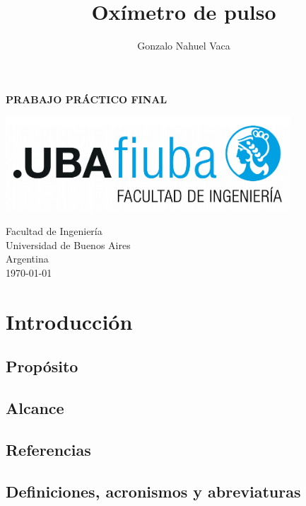 \documentclass[
    11pt,
    spanish,
	a4paper
]{article}
\title{Oxímetro de pulso}
\author{Gonzalo Nahuel Vaca}
\def\doctype{PRABAJO PRÁCTICO FINAL}
\begin{document}
\makeatletter
\begin{titlepage}
	\begin{center}
		\vspace*{1cm}
		
		\Huge
		\textbf{\doctype}
		
		\vspace{0.5cm}
		\LARGE
		\@title
		
		\vspace{1.5cm}
		
		\textbf{\@author}

		\vspace{3.5cm}

		\includegraphics[width=0.8\textwidth]{img/logoFIUBA.pdf}
		
		\vfill
		Facultad de Ingeniería\\
		Universidad de Buenos Aires\\
		Argentina\\
		\today
	\end{center}
\end{titlepage}
\makeatother
\newpage

\section{Introducción}
\label{sec:introduccion}

\subsection{Propósito}
\label{subsec:proposito}

\subsection{Alcance}
\label{subsec:alcance}

\subsection{Referencias}
\label{subsec:referencias}

\subsection{Definiciones, acronismos y abreviaturas}
\label{subsec:definiciones}
\end{document}
